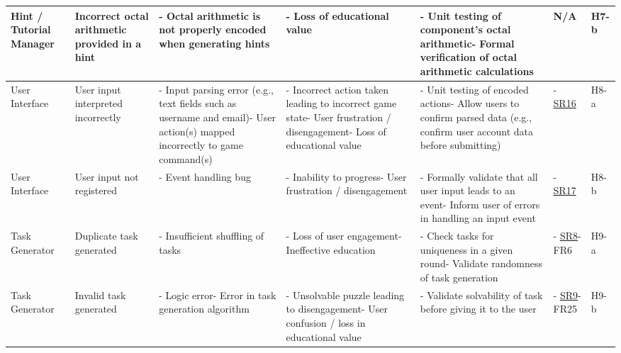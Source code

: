 \documentclass{article}
\begin{document}
\begin{landscape}
\begin{tabularx}{\linewidth}{|P{2.3cm}|Y|Y|Y|Y|P{1.7cm}|P{0.8cm}|}
    \hline

    Hint / Tutorial Manager &
    Incorrect octal arithmetic provided in a hint &
    - Octal arithmetic is not properly encoded when generating hints &
    - Loss of educational value &
    - Unit testing of component's octal arithmetic\newline- Formal verification of octal arithmetic calculations &
    N/A &
    H7-b \\

    \hline

    User Interface &
    User input interpreted incorrectly &
    - Input parsing error (e.g., text fields such as username and email)\newline- User action(s) mapped incorrectly to game command(s) &
    - Incorrect action taken leading to incorrect game state\newline- User frustration / disengagement\newline- Loss of educational value &
    - Unit testing of encoded actions\newline- Allow users to confirm parsed data (e.g., confirm user account data before submitting) &
    - \hyperref[req:SR16]{SR16} &
    H8-a \\

    \hline

    User Interface &
    User input not registered &
    - Event handling bug &
    - Inability to progress\newline- User frustration / disengagement &
    - Formally validate that all user input leads to an event\newline- Inform user of errors in handling an input event &
    - \hyperref[req:SR17]{SR17} &
    H8-b \\

    \hline

    Task Generator &
    Duplicate task generated &
    - Insufficient shuffling of tasks &
    - Loss of user engagement\newline- Ineffective education &
    - Check tasks for uniqueness in a given round\newline- Validate randomness of task generation &
    - \hyperref[req:SR8]{SR8}\newline- FR6 &
    H9-a \\

    \hline

    Task Generator &
    Invalid task generated &
    - Logic error\newline- Error in task generation algorithm &
    - Unsolvable puzzle leading to disengagement\newline- User confusion / loss in educational value &
    - Validate solvability of task before giving it to the user &
    - \hyperref[req:SR9]{SR9}\newline- FR25 &
    H9-b \\


\end{tabularx}
\end{landscape}
\end{document}
